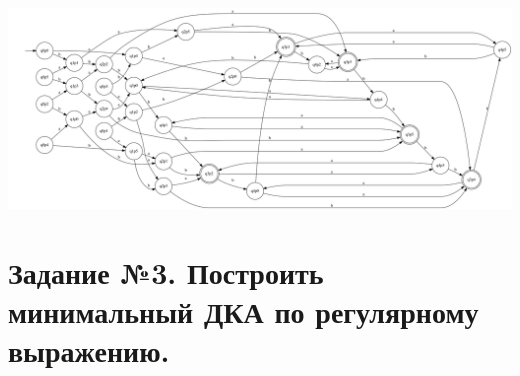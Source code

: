 \documentclass{article}
\begin{document}
\begin{enumerate}
    \begin{center}
        \includegraphics[width=1.1\textwidth]{g25.png}
    \end{center}
\end{enumerate}







\section{Задание №3. Построить минимальный ДКА по регулярному выражению.}
\end{document}
